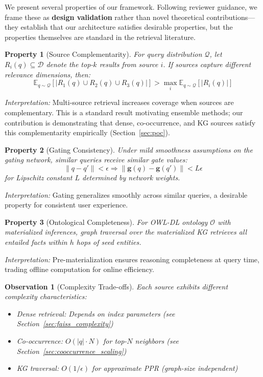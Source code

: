 \documentclass[11pt,a4paper]{article}
\newtheorem{property}{Property}
\newtheorem{observation}{Observation}
\begin{document}
We present several properties of our framework. Following reviewer guidance, we frame these as \textbf{design validation} rather than novel theoretical contributions---they establish that our architecture satisfies desirable properties, but the properties themselves are standard in the retrieval literature.

\begin{property}[Source Complementarity]
\label{prop:complementarity}
For query distribution $\mathcal{Q}$, let $R_i(q) \subseteq \mathcal{D}$ denote the top-$k$ results from source $i$. If sources capture different relevance dimensions, then:
\begin{equation}
\mathbb{E}_{q \sim \mathcal{Q}}\left[|R_1(q) \cup R_2(q) \cup R_3(q)|\right] > \max_i \mathbb{E}_{q \sim \mathcal{Q}}\left[|R_i(q)|\right]
\end{equation}
\end{property}

\textit{Interpretation:} Multi-source retrieval increases coverage when sources are complementary. This is a standard result motivating ensemble methods; our contribution is demonstrating that dense, co-occurrence, and KG sources satisfy this complementarity empirically (Section~\ref{sec:poc}).

\begin{property}[Gating Consistency]
\label{prop:gating}
Under mild smoothness assumptions on the gating network, similar queries receive similar gate values:
\begin{equation}
\|q - q'\| < \epsilon \Rightarrow \|\mathbf{g}(q) - \mathbf{g}(q')\| < L\epsilon
\end{equation}
for Lipschitz constant $L$ determined by network weights.
\end{property}

\textit{Interpretation:} Gating generalizes smoothly across similar queries, a desirable property for consistent user experience.

\begin{property}[Ontological Completeness]
\label{prop:owl}
For OWL-DL ontology $\mathcal{O}$ with materialized inferences, graph traversal over the materialized KG retrieves all entailed facts within $h$ hops of seed entities.
\end{property}

\textit{Interpretation:} Pre-materialization ensures reasoning completeness at query time, trading offline computation for online efficiency.

\begin{observation}[Complexity Trade-offs]
\label{obs:complexity}
Each source exhibits different complexity characteristics:
\begin{itemize}
    \item Dense retrieval: Depends on index parameters (see Section~\ref{sec:faiss_complexity})
    \item Co-occurrence: $O(|q| \cdot N)$ for top-$N$ neighbors (see Section~\ref{sec:cooccurrence_scaling})
    \item KG traversal: $O(1/\epsilon)$ for approximate PPR (graph-size independent)
\end{itemize}
\end{observation}
\end{document}
